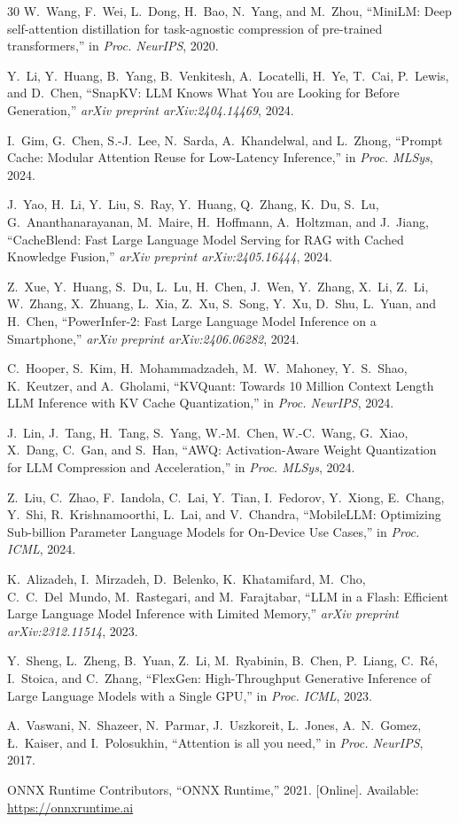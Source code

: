 \documentclass[journal]{IEEEtran}
\begin{document}
\begin{thebibliography}{30}
W.~Wang, F.~Wei, L.~Dong, H.~Bao, N.~Yang, and M.~Zhou,
``{MiniLM: Deep self-attention distillation for task-agnostic compression of pre-trained transformers},''
in \emph{Proc. NeurIPS}, 2020.

Y.~Li, Y.~Huang, B.~Yang, B.~Venkitesh, A.~Locatelli, H.~Ye, T.~Cai, P.~Lewis, and D.~Chen,
``{SnapKV: LLM Knows What You are Looking for Before Generation},''
\emph{arXiv preprint arXiv:2404.14469}, 2024.

I.~Gim, G.~Chen, S.-J.~Lee, N.~Sarda, A.~Khandelwal, and L.~Zhong,
``{Prompt Cache: Modular Attention Reuse for Low-Latency Inference},''
in \emph{Proc. MLSys}, 2024.

J.~Yao, H.~Li, Y.~Liu, S.~Ray, Y.~Huang, Q.~Zhang, K.~Du, S.~Lu, G.~Ananthanarayanan, M.~Maire, H.~Hoffmann, A.~Holtzman, and J.~Jiang,
``{CacheBlend: Fast Large Language Model Serving for RAG with Cached Knowledge Fusion},''
\emph{arXiv preprint arXiv:2405.16444}, 2024.

Z.~Xue, Y.~Huang, S.~Du, L.~Lu, H.~Chen, J.~Wen, Y.~Zhang, X.~Li, Z.~Li, W.~Zhang, X.~Zhuang, L.~Xia, Z.~Xu, S.~Song, Y.~Xu, D.~Shu, L.~Yuan, and H.~Chen,
``{PowerInfer-2: Fast Large Language Model Inference on a Smartphone},''
\emph{arXiv preprint arXiv:2406.06282}, 2024.

C.~Hooper, S.~Kim, H.~Mohammadzadeh, M.~W.~Mahoney, Y.~S.~Shao, K.~Keutzer, and A.~Gholami,
``{KVQuant: Towards 10 Million Context Length LLM Inference with KV Cache Quantization},''
in \emph{Proc. NeurIPS}, 2024.

J.~Lin, J.~Tang, H.~Tang, S.~Yang, W.-M.~Chen, W.-C.~Wang, G.~Xiao, X.~Dang, C.~Gan, and S.~Han,
``{AWQ: Activation-Aware Weight Quantization for LLM Compression and Acceleration},''
in \emph{Proc. MLSys}, 2024.

Z.~Liu, C.~Zhao, F.~Iandola, C.~Lai, Y.~Tian, I.~Fedorov, Y.~Xiong, E.~Chang, Y.~Shi, R.~Krishnamoorthi, L.~Lai, and V.~Chandra,
``{MobileLLM: Optimizing Sub-billion Parameter Language Models for On-Device Use Cases},''
in \emph{Proc. ICML}, 2024.

K.~Alizadeh, I.~Mirzadeh, D.~Belenko, K.~Khatamifard, M.~Cho, C.~C.~Del~Mundo, M.~Rastegari, and M.~Farajtabar,
``{LLM in a Flash: Efficient Large Language Model Inference with Limited Memory},''
\emph{arXiv preprint arXiv:2312.11514}, 2023.

Y.~Sheng, L.~Zheng, B.~Yuan, Z.~Li, M.~Ryabinin, B.~Chen, P.~Liang, C.~R\'{e}, I.~Stoica, and C.~Zhang,
``{FlexGen: High-Throughput Generative Inference of Large Language Models with a Single GPU},''
in \emph{Proc. ICML}, 2023.

A.~Vaswani, N.~Shazeer, N.~Parmar, J.~Uszkoreit, L.~Jones, A.~N.~Gomez, {\L}.~Kaiser, and I.~Polosukhin,
``{Attention is all you need},''
in \emph{Proc. NeurIPS}, 2017.

ONNX Runtime Contributors,
``{ONNX Runtime},''
2021. [Online]. Available: \url{https://onnxruntime.ai}

\end{thebibliography}
\end{document}
